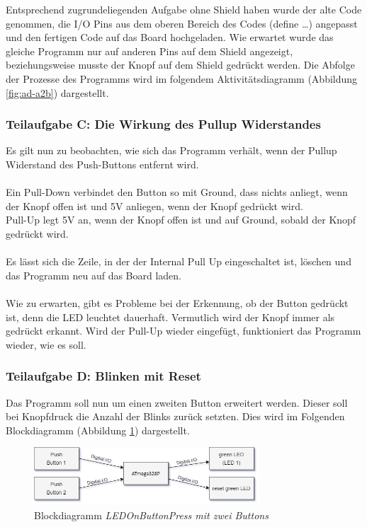 \documentclass{article}
\begin{document}
\vfill

\noindent Entsprechend zugrundeliegenden Aufgabe ohne Shield haben wurde der alte Code genommen, die I/O Pins aus dem oberen Bereich des Codes (define …) angepasst und den fertigen Code auf das Board hochgeladen. Wie erwartet wurde das gleiche Programm nur auf anderen Pins auf dem Shield angezeigt, beziehungsweise musste der Knopf auf dem Shield gedrückt werden.
Die Abfolge der Prozesse des Programms wird im folgendem Aktivitätsdiagramm (Abbildung \ref{fig:ad-a2b}) dargestellt.

\clearpage

\subsubsection{Teilaufgabe C: Die Wirkung des Pullup Widerstandes}

\noindent Es gilt nun zu beobachten, wie sich das Programm verhält, wenn der Pullup Widerstand des Push-Buttons entfernt wird.
\\
\\ Ein Pull-Down verbindet den Button so mit Ground, dass nichts anliegt, wenn der Knopf offen ist und 5V anliegen, wenn der Knopf gedrückt wird. 
\\ Pull-Up legt 5V an, wenn der Knopf offen ist und auf Ground, sobald der Knopf gedrückt wird.
\\
\\ Es lässt sich die Zeile, in der der Internal Pull Up eingeschaltet ist, löschen und das Programm neu auf das Board laden.
\\
\\
Wie zu erwarten, gibt es Probleme bei der Erkennung, ob der Button gedrückt ist, denn die LED leuchtet dauerhaft. Vermutlich wird der Knopf immer als gedrückt erkannt. 
Wird der Pull-Up wieder eingefügt, funktioniert das Programm wieder, wie es soll.

\subsubsection{Teilaufgabe D: Blinken mit Reset}

\noindent Das Programm soll nun um einen zweiten Button erweitert werden. Dieser soll bei Knopfdruck die Anzahl der Blinks zurück setzten. Dies wird im Folgenden Blockdiagramm (Abbildung \ref{fig:bd-a2d}) dargestellt.\\

\begin{figure}[htb]
    \centering
    \includegraphics[width=0.75\textwidth]{images/A2d-BD-LEDOnButtonPressmitErweiterungumButton2.d.png}
    \caption{Blockdiagramm \textit{LEDOnButtonPress mit zwei Buttons}}
    \label{fig:bd-a2d}
\end{figure}
\end{document}
